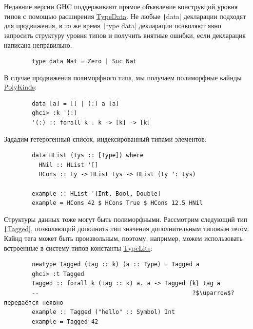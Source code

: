 \documentclass[12pt]{article}
\begin{document}
    Недавние версии GHC поддерживают прямое объявление конструкций уровня типов с помощью расширения \href{https://downloads.haskell.org/ghc/latest/docs/users_guide/exts/type_data.html#extension-TypeData}{TypeData}.
    Не любые \texttt|data| декларации подходят для продвижения, в то же время \texttt|type data| декларации позволяют явно запросить структуру уровня типов и получить внятные ошибки, если декларация написана неправильно.
    \begin{verbatim}
        type data Nat = Zero | Suc Nat
    \end{verbatim}

    В случае продвижения полиморфного типа, мы получаем полиморфные кайнды \href{https://downloads.haskell.org/ghc/latest/docs/users_guide/exts/poly_kinds.html}{PolyKinds}:
    \begin{verbatim}
        data [a] = [] | (:) a [a]
        ghci> :k '(:)
        '(:) :: forall k . k -> [k] -> [k]
    \end{verbatim}

    Зададим гетерогенный список, индексированный типами элементов:
    \begin{verbatim}
        data HList (tys :: [Type]) where
          HNil :: HList '[]
          HCons :: ty -> HList tys -> HList (ty ': tys)

        example :: HList '[Int, Bool, Double]
        example = HCons 42 $ HCons True $ HCons 12.5 HNil
    \end{verbatim}

    Структуры данных тоже могут быть полиморфными.
    Рассмотрим следующий тип \href{https://hackage.haskell.org/package/tagged-0.8.8/docs/Data-Tagged.html#t:Tagged}{\texttt|Tagged|}, позволяющий дополнить тип значения дополнительным типовым тегом.
    Кайнд тега может быть произвольным, поэтому, например, можем использовать встроенные в систему типов константы \href{https://ghc.gitlab.haskell.org/ghc/doc/users_guide/exts/type_literals.html}{TypeLits}:
    \begin{verbatim}
        newtype Tagged (tag :: k) (a :: Type) = Tagged a
        ghci> :t Tagged
        Tagged :: forall k (tag :: k) a. a -> Tagged {k} tag a
        --                                            ?$\uparrow$? передаётся неявно
        example :: Tagged ("hello" :: Symbol) Int
        example = Tagged 42
    \end{verbatim}
\end{document}

